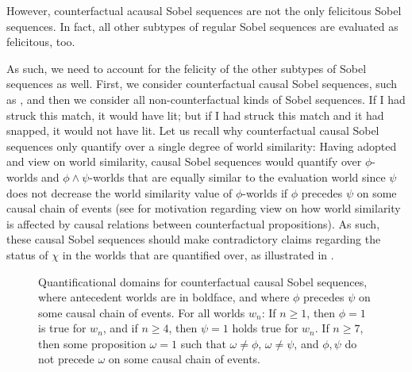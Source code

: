 However, counterfactual acausal Sobel sequences are not the only felicitous Sobel sequences. In fact, all other subtypes of regular Sobel sequences are evaluated as felicitous, too.
\begin{table}[!htb]
\end{table}
As such, we need to account for the felicity of the other subtypes of Sobel sequences as well. First, we consider counterfactual causal Sobel sequences, such as , and then we consider all non-counterfactual kinds of Sobel sequences.
\ex{}If I had struck this match, it would have lit; but if I had struck this match and it had snapped, it would not have lit.
\xe
Let us recall why counterfactual causal Sobel sequences only quantify over a single degree of world similarity: Having adopted \textcite{Bennett2003} and  view on world similarity, causal Sobel sequences would quantify over $\phi$-worlds and $\phi\land\psi$-worlds that are equally similar to the evaluation world since $\psi$ does not decrease the world similarity value of $\phi$-worlds if $\phi$ precedes $\psi$ on some causal chain of events (see  for  motivation regarding  view on how world similarity is affected by causal relations between counterfactual propositions). As such, these causal Sobel sequences should make contradictory claims regarding the status of $\chi$ in the worlds that are quantified over, as illustrated in .
\begin{figure}[!htb]

\caption{Quantificational domains for counterfactual causal Sobel sequences, where antecedent worlds are in boldface, and where $\phi$ precedes $\psi$ on some causal chain of events. For all worlds $w_n$: If $n\geqslant1$, then $\phi=1$ is true for $w_n$, and if $n\geqslant 4$, then $\psi=1$ holds true for $w_n$. If $n\geqslant 7$, then some proposition $\omega=1$ such that $\omega\neq\phi$, $\omega\neq\psi$, and $\phi,\psi$ do not precede $\omega$ on some causal chain of events.}
\end{figure}

